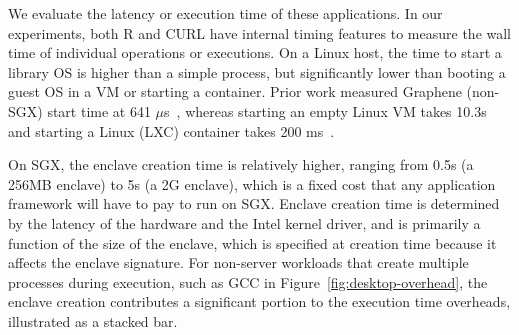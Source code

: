 We evaluate the latency or execution time of these applications. 
In our experiments, both R and CURL have internal timing features to measure the wall time
of individual operations or executions.
On a Linux host, the time to start a library OS is higher than a simple 
process, but significantly lower than booting a guest OS in a VM or
starting a container. 
Prior work measured Graphene (non-SGX) start time at 641 $\mu$s~\cite{tsai14graphene}, whereas starting an empty Linux VM takes 10.3s and starting a Linux (LXC) container takes 200 ms~\cite{agarwal15container}. 


On SGX, the enclave creation time is relatively higher,  ranging from 0.5s (a 256MB enclave) to 5s (a 2G enclave), which is a fixed cost that any application framework
will have to pay to run on SGX.
Enclave creation time is determined by the latency of the hardware and the Intel kernel driver, and is primarily a function of the size of 
the enclave, which is specified at creation time because it affects the enclave signature. %
For non-server workloads that create multiple processes during execution,
such as GCC in Figure~\ref{fig:desktop-overhead},
the enclave creation contributes a significant portion to the execution time overheads, illustrated as a stacked bar.

